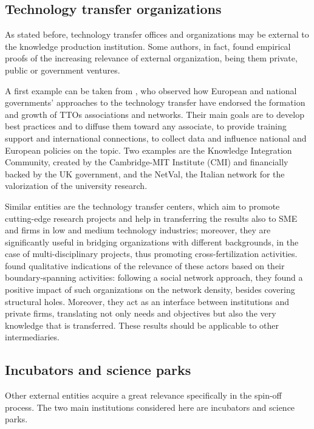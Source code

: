 \subsection{Technology transfer organizations}

As stated before, technology transfer offices and organizations may be external to the knowledge production institution. Some authors, in fact, found empirical proofs of the increasing relevance of external organization, being them private, public or government ventures.

A first example can be taken from \citet{Geuna2009}, who observed how European and national governments' approaches to the technology transfer have endorsed the formation and growth of TTOs associations and networks. Their main goals are to develop best practices and to diffuse them toward any associate, to provide training support and international connections, to collect data and influence national and European policies on the topic. Two examples are the Knowledge Integration Community, created by the Cambridge-MIT Institute (CMI) and financially backed by the UK government, and the NetVal, the Italian network for the valorization of the university research.

Similar entities are the technology transfer centers, which aim to promote cutting-edge research projects and help in transferring the results also to SME and firms in low and medium technology industries; moreover, they are significantly useful in bridging organizations with different backgrounds, in the case of multi-disciplinary projects, thus promoting cross-fertilization activities. \citet{Comacchio2012} found qualitative indications of the relevance of these actors based on their boundary-spanning activities: following a social network approach, they found a positive impact of such organizations on the network density, besides covering structural holes. Moreover, they act as an interface between institutions and private firms, translating not only needs and objectives but also the very knowledge that is transferred. These results should be applicable to other intermediaries.

\subsection{Incubators and science parks}
Other external entities acquire a great relevance specifically in the spin-off process. The two main institutions considered here are incubators and science parks. 

